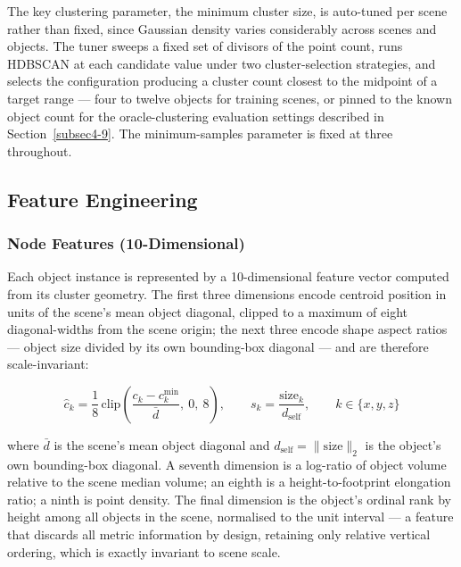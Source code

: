 \documentclass[sn-mathphys,Numbered]{sn-jnl}
\begin{document}
The key clustering parameter, the minimum cluster size, is auto-tuned per scene rather than fixed, since Gaussian density varies considerably across scenes and objects. The tuner sweeps a fixed set of divisors of the point count, runs HDBSCAN at each candidate value under two cluster-selection strategies, and selects the configuration producing a cluster count closest to the midpoint of a target range --- four to twelve objects for training scenes, or pinned to the known object count for the oracle-clustering evaluation settings described in Section~\ref{subsec4-9}. The minimum-samples parameter is fixed at three throughout.

\FloatBarrier
\subsection{Feature Engineering}\label{subsec4-3}

\subsubsection{Node Features (10-Dimensional)}\label{subsubsec4-3-1}

Each object instance is represented by a 10-dimensional feature vector computed from its cluster geometry. The first three dimensions encode centroid position in units of the scene's mean object diagonal, clipped to a maximum of eight diagonal-widths from the scene origin; the next three encode shape aspect ratios --- object size divided by its own bounding-box diagonal --- and are therefore scale-invariant:

\begin{equation}
\hat{c}_k = \frac{1}{8}\,\mathrm{clip}\!\left(\frac{c_k - c_k^{\min}}{\bar d},\ 0,\ 8\right), \qquad s_k = \frac{\mathrm{size}_k}{d_{\text{self}}}, \qquad k \in \{x,y,z\}
\label{eq:nodefeat}
\end{equation}

where $\bar d$ is the scene's mean object diagonal and $d_{\text{self}} = \lVert\mathrm{size}\rVert_2$ is the object's own bounding-box diagonal. A seventh dimension is a log-ratio of object volume relative to the scene median volume; an eighth is a height-to-footprint elongation ratio; a ninth is point density. The final dimension is the object's ordinal rank by height among all objects in the scene, normalised to the unit interval --- a feature that discards all metric information by design, retaining only relative vertical ordering, which is exactly invariant to scene scale.
\end{document}
